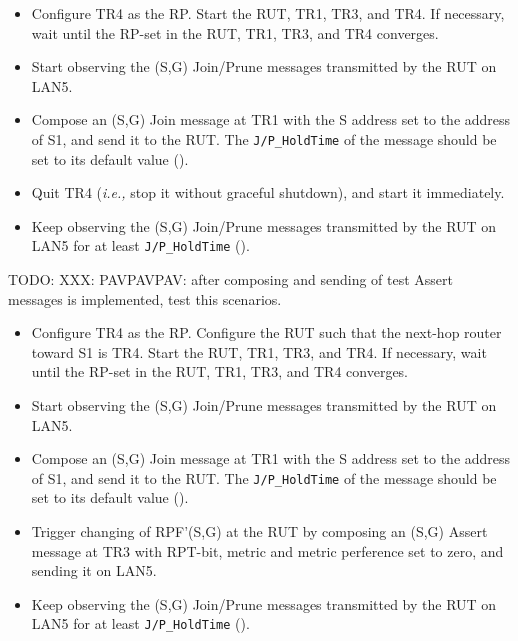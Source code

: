 \documentclass[11pt]{report}
\newcommand{\ie}{\emph{i.e.,}\xspace}
\begin{document}

\begin{itemize}

  \item Configure TR4 as the RP. Start the RUT, TR1, TR3, and TR4. If
  necessary, wait until the RP-set in the RUT, TR1, TR3, and TR4
  converges.

  \item Start observing the (S,G) Join/Prune messages transmitted by the
  RUT on LAN5.

  \item Compose an (S,G) Join message at TR1 with the S address set to the
  address of S1, and send it to the RUT. 
  The \verb=J/P_HoldTime= of the message should be set to its default
  value ({\PimsmJPHoldTime}).

  \item Quit TR4 (\ie stop it without graceful shutdown), and start it
  immediately.

  \item Keep observing the (S,G) Join/Prune messages transmitted by the
  RUT on LAN5 for at least \verb=J/P_HoldTime= ({\PimsmJPHoldTime}).

\end{itemize}


TODO: XXX: PAVPAVPAV: after composing and sending of test Assert messages is
implemented, test this scenarios.

\begin{itemize}

  \item Configure TR4 as the RP.
  Configure the RUT such that the next-hop router toward S1 is TR4.
  Start the RUT, TR1, TR3, and TR4.
  If necessary, wait until the RP-set in the RUT, TR1, TR3, and TR4
  converges.

  \item Start observing the (S,G) Join/Prune messages transmitted by the
  RUT on LAN5.

  \item Compose an (S,G) Join message at TR1 with the S address set to the
  address of S1, and send it to the RUT. 
  The \verb=J/P_HoldTime= of the message should be set to its default
  value ({\PimsmJPHoldTime}).

  \item Trigger changing of RPF'(S,G) at the RUT by composing an
  (S,G) Assert message at TR3 with RPT-bit, metric and metric 
  perference set to zero, and sending it on LAN5.

  \item Keep observing the (S,G) Join/Prune messages transmitted by the
  RUT on LAN5 for at least \verb=J/P_HoldTime= ({\PimsmJPHoldTime}).

\end{itemize}
\end{document}

